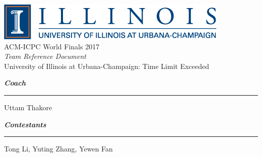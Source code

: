 \documentclass[10pt]{article}
\begin{document}
\thispagestyle{empty}
\begin{center}
    \includegraphics[scale=0.7]{logo.png} \\
    \vspace{15mm}
    {\Huge ACM-ICPC World Finals 2017}\\
    \vspace{10mm}
    {\LARGE \textit{Team Reference Document}} \\
    \vspace{10mm}
    {\LARGE University of Illinois at Urbana-Champaign: Time Limit Exceeded} \\
    \vspace{30mm}
\end{center}

    {\Large \textbf{\textit{Coach}}}
    \vspace{5mm}
    \hrule
    \vspace{5mm}
    {\Large Uttam Thakore } \\
    \vspace{10mm}


    {\Large \textbf{\textit{Contestants}}}
    \vspace{5mm}
    \hrule
    \vspace{5mm}
    {\Large Tong Li, Yuting Zhang, Yewen Fan }
\end{document}
